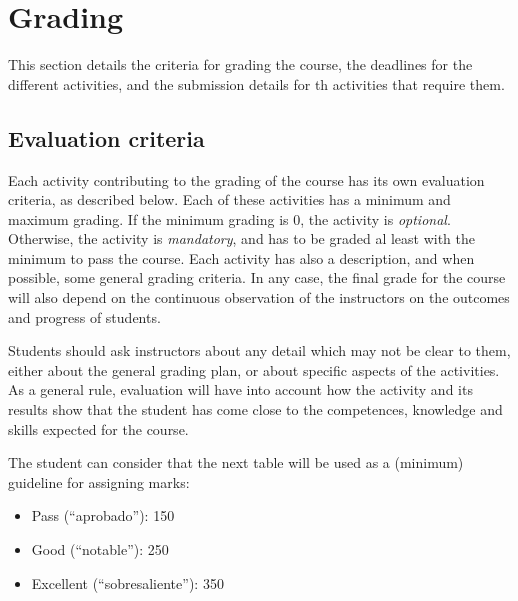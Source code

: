 \documentclass[a4paper]{article}
\begin{document}
% 

\section{Grading}

This section details the criteria for grading the course, the deadlines for the different activities, and the submission details for th activities that require them.

\subsection{Evaluation criteria}
\label{sub:evaluation-criteria}

Each activity contributing to the grading of the course has its own evaluation criteria, 
as described below. Each of these activities has a minimum and maximum grading. If the 
minimum grading is 0, the activity is \textit{optional}. Otherwise, the activity is \textit{mandatory}, and 
has to be graded al least with the minimum to pass the course. Each activity has also a 
description, and when possible, some general grading criteria. In any case, the final grade 
for the course will also depend on the continuous observation of the instructors on the 
outcomes and progress of students.

Students should ask instructors about any detail which may not be clear to them, 
either about the general grading plan, or about specific aspects of the activities. 
As a general rule, evaluation will have into account how the activity and its results 
show that the student has come close to the competences, knowledge and skills expected 
for the course.

The student can consider that the next table will be used as a (minimum) guideline for 
assigning marks:

\begin{itemize}
\item Pass (``aprobado''): 150
\item Good (``notable''): 250
\item Excellent (``sobresaliente''): 350
\end{itemize}
\end{document}
